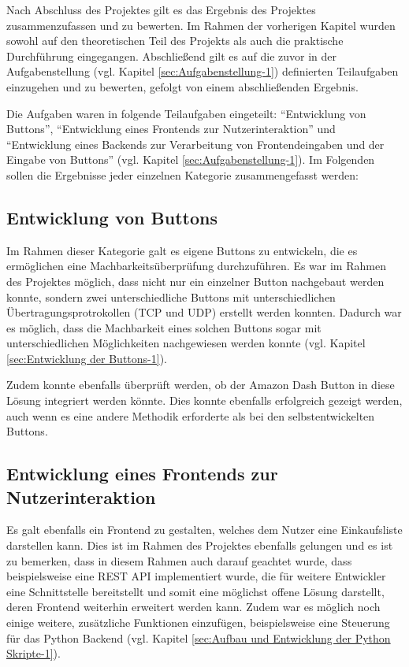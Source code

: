 Nach Abschluss des Projektes gilt es das Ergebnis des Projektes zusammenzufassen und zu bewerten. Im Rahmen der vorherigen Kapitel wurden sowohl auf den theoretischen Teil des Projekts als auch die praktische Durchführung eingegangen. Abschließend gilt es auf die zuvor in der Aufgabenstellung (vgl. Kapitel \ref{sec:Aufgabenstellung-1}) definierten Teilaufgaben einzugehen und zu bewerten, gefolgt von einem abschließenden Ergebnis. 

Die Aufgaben waren in folgende Teilaufgaben eingeteilt: ``Entwicklung von Buttons'', ``Entwicklung eines Frontends zur Nutzerinteraktion'' und ``Entwicklung eines Backends zur Verarbeitung von Frontendeingaben und der Eingabe von Buttons'' (vgl. Kapitel \ref{sec:Aufgabenstellung-1}). Im Folgenden sollen die Ergebnisse jeder einzelnen Kategorie zusammengefasst werden:

\subsection{Entwicklung von Buttons}
\label{sec:ErgebnisButtons}
Im Rahmen dieser Kategorie galt es eigene Buttons zu entwickeln, die es ermöglichen eine Machbarkeitsüberprüfung durchzuführen. Es war im Rahmen des Projektes möglich, dass nicht nur ein einzelner Button nachgebaut werden konnte, sondern zwei unterschiedliche Buttons mit unterschiedlichen Übertragungsprotrokollen (\ac{TCP} und \ac{UDP}) erstellt werden konnten. Dadurch war es möglich, dass die Machbarkeit eines solchen Buttons sogar mit unterschiedlichen Möglichkeiten nachgewiesen werden konnte (vgl. Kapitel \ref{sec:Entwicklung der Buttons-1}).

Zudem konnte ebenfalls überprüft werden, ob der Amazon Dash Button in diese Lösung integriert werden könnte. Dies konnte ebenfalls erfolgreich gezeigt werden, auch wenn es eine andere Methodik erforderte als bei den selbstentwickelten Buttons.

\subsection{Entwicklung eines Frontends zur Nutzerinteraktion}
\label{sec:ErgebnisFrontend}
Es galt ebenfalls ein Frontend zu gestalten, welches dem Nutzer eine Einkaufsliste darstellen kann. Dies ist im Rahmen des Projektes ebenfalls gelungen und es ist zu bemerken, dass in diesem Rahmen auch darauf geachtet wurde, dass beispielsweise eine \ac{REST} \ac{API} implementiert wurde, die für weitere Entwickler eine Schnittstelle bereitstellt und somit eine möglichst offene Lösung darstellt, deren Frontend weiterhin erweitert werden kann. Zudem war es möglich noch einige weitere, zusätzliche Funktionen einzufügen, beispielsweise eine Steuerung für das Python Backend (vgl. Kapitel \ref{sec:Aufbau und Entwicklung der Python Skripte-1}). 

